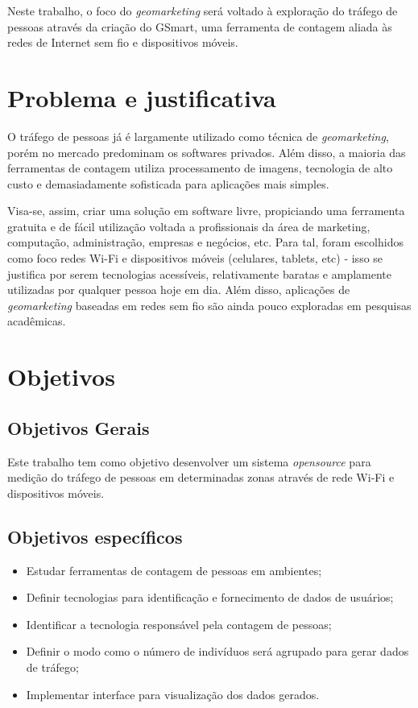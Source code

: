 Neste trabalho, o foco do \emph{geomarketing} será voltado à exploração do tráfego
de pessoas através da criação do GSmart, uma ferramenta de contagem aliada às redes de
Internet sem fio e dispositivos móveis.

\section{Problema e justificativa}
O tráfego de pessoas já é largamente utilizado como técnica de \emph{geomarketing}, porém
no mercado predominam os softwares privados. Além disso, a maioria das ferramentas de contagem utiliza processamento de imagens, tecnologia de alto custo e demasiadamente sofisticada para aplicações mais simples.

Visa-se, assim, criar uma solução em software livre, propiciando uma ferramenta gratuita e de fácil utilização voltada a profissionais da área de marketing, computação, administração, empresas e negócios, etc. Para tal, foram escolhidos como foco redes Wi-Fi e dispositivos móveis (celulares, tablets, etc) - isso se justifica por serem tecnologias acessíveis, relativamente baratas e amplamente utilizadas por qualquer pessoa hoje em dia. Além disso, aplicações de \emph{geomarketing} baseadas em redes sem fio são ainda pouco exploradas em pesquisas acadêmicas.

\section{Objetivos}
\label{objetivos}

\subsection{Objetivos Gerais}
Este trabalho tem como objetivo desenvolver um sistema \emph{opensource} para medição do tráfego de
pessoas em determinadas zonas através de rede Wi-Fi e dispositivos móveis.

\subsection{Objetivos específicos}
\begin{itemize}
  \item Estudar ferramentas de contagem de pessoas em ambientes;
  \item Definir tecnologias para identificação e fornecimento de dados de usuários;
  \item Identificar a tecnologia responsável pela contagem de pessoas;
  \item Definir o modo como o número de indivíduos será agrupado para gerar dados de tráfego;
  \item Implementar interface para visualização dos dados gerados.
\end{itemize}


